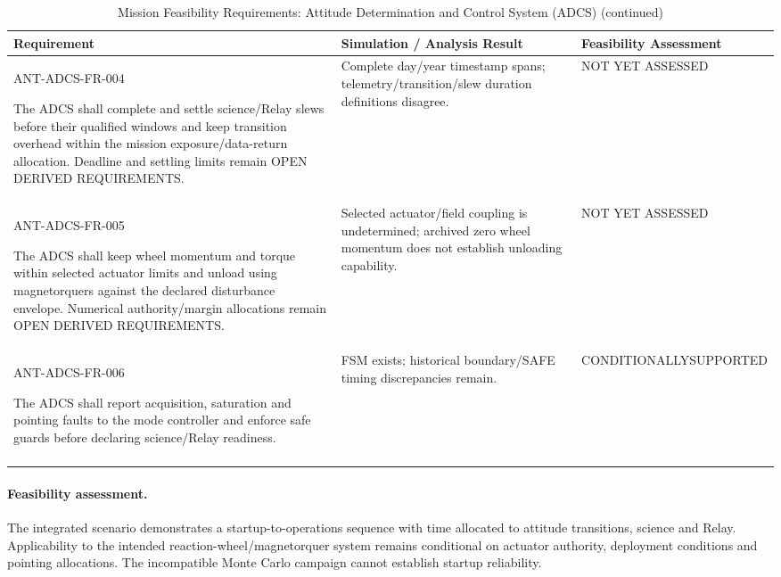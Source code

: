 \begin{table}[H]\centering\small\setlength{\tabcolsep}{3pt}
\ContinuedFloat\captionsetup{list=no}
\caption{Mission Feasibility Requirements: Attitude Determination and Control System (ADCS) (continued)}
\begin{tabular}{@{}
>{\RaggedRight\arraybackslash}p{}
>{\RaggedRight\arraybackslash}p{}
>{\RaggedRight\arraybackslash}p{}
@{}}
\toprule Requirement & Simulation / Analysis Result & Feasibility Assessment\\\midrule
{}\label{req:ANT-ADCS-FR-004}\mbox{ANT-ADCS-}\newline\mbox{FR-004}\par The ADCS shall complete and settle science/Relay slews before their qualified windows and keep transition overhead within the mission exposure/data-return allocation. Deadline and settling limits remain OPEN DERIVED REQUIREMENTS. & Complete day/year timestamp spans; telemetry/transition/slew duration definitions disagree. & NOT YET ASSESSED\\
\addlinespace[3pt]
\label{req:ANT-ADCS-FR-005}\mbox{ANT-ADCS-}\newline\mbox{FR-005}\par The ADCS shall keep wheel momentum and torque within selected actuator limits and unload using magnetorquers against the declared disturbance envelope. Numerical authority/margin allocations remain OPEN DERIVED REQUIREMENTS. & Selected actuator/field coupling is undetermined; archived zero wheel momentum does not establish unloading capability. & NOT YET ASSESSED\\
\addlinespace[3pt]
\label{req:ANT-ADCS-FR-006}\mbox{ANT-ADCS-}\newline\mbox{FR-006}\par The ADCS shall report acquisition, saturation and pointing faults to the mode controller and enforce safe guards before declaring science/Relay readiness. & FSM exists; historical boundary/SAFE timing discrepancies remain. & CONDITIONALLY\newline SUPPORTED\\
\addlinespace[3pt]
\bottomrule
\end{tabular}
\end{table}
\paragraph{Feasibility assessment.} The integrated scenario demonstrates a startup-to-operations sequence with time allocated to attitude transitions, science and Relay. Applicability to the intended reaction-wheel/magnetorquer system remains conditional on actuator authority, deployment conditions and pointing allocations. The incompatible Monte Carlo campaign cannot establish startup reliability.
